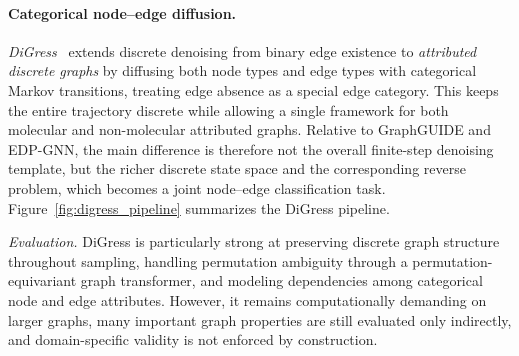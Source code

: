 \documentclass{article}
\begin{document}
\paragraph{Categorical node--edge diffusion.}

\emph{DiGress}~\cite{vignac2022digress} extends discrete denoising from binary edge existence to \emph{attributed discrete graphs} by diffusing both node types and edge types with categorical Markov transitions, treating edge absence as a special edge category. This keeps the entire trajectory discrete while allowing a single framework for both molecular and non-molecular attributed graphs. Relative to GraphGUIDE and EDP-GNN, the main difference is therefore not the overall finite-step denoising template, but the richer discrete state space and the corresponding reverse problem, which becomes a joint node--edge classification task. Figure~\ref{fig:digress_pipeline} summarizes the DiGress pipeline. 

\emph{Evaluation.} DiGress is particularly strong at preserving discrete graph structure throughout sampling, handling permutation ambiguity through a permutation-equivariant graph transformer, and modeling dependencies among categorical node and edge attributes. However, it remains computationally demanding on larger graphs, many important graph properties are still evaluated only indirectly, and domain-specific validity is not enforced by construction.
\end{document}
